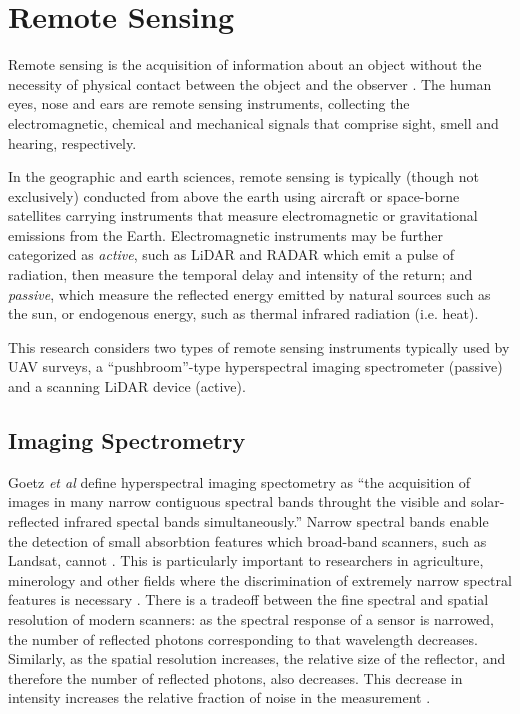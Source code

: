 \label{chapter:lit_review}

\newlength{\savedunitlength}
\setlength{\unitlength}{2em}

\section{Remote Sensing}

Remote sensing is the acquisition of information about an object without the necessity of physical contact between the object and the observer \cite{Gupta2018}. The human eyes, nose and ears are remote sensing instruments, collecting the electromagnetic, chemical and mechanical signals that comprise sight, smell and hearing, respectively.

In the geographic and earth sciences, remote sensing is typically (though not exclusively) conducted from above the earth using aircraft or space-borne satellites carrying instruments that measure electromagnetic or gravitational emissions from the Earth. Electromagnetic instruments may be further categorized as \emph{active}, such as LiDAR and RADAR which emit a pulse of radiation, then measure the temporal delay and intensity of the return; and \emph{passive}, which measure the reflected energy emitted by natural sources such as the sun, or endogenous energy, such as thermal infrared radiation (i.e. heat).

This research considers two types of remote sensing instruments typically used by UAV surveys, a ``pushbroom''-type hyperspectral imaging spectrometer (passive) and a scanning LiDAR device (active). 

\subsection{Imaging Spectrometry}

Goetz \emph{et al} \cite{Goetz1985} define hyperspectral imaging spectometry as ``the acquisition of images in many narrow contiguous spectral bands throught the visible and solar-reflected infrared spectal bands simultaneously.'' Narrow spectral bands enable the detection of small absorbtion features which broad-band scanners, such as Landsat, cannot \cite{Goetz1985}. This is particularly important to researchers in agriculture, minerology and other fields where the discrimination of extremely narrow spectral features is necessary \cite{Goetz1985}. There is a tradeoff between the fine spectral and spatial resolution of modern scanners: as the spectral response of a sensor is narrowed, the number of reflected photons corresponding to that wavelength decreases. Similarly, as the spatial resolution increases, the relative size of the reflector, and therefore the number of reflected photons, also decreases. This decrease in intensity increases the relative fraction of noise in the measurement \cite{Moses2012}.

